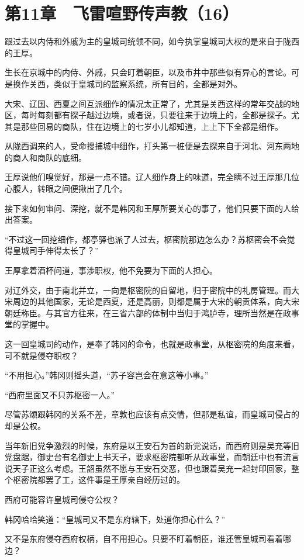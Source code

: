 \section{第11章　飞雷喧野传声教（16）}

跟过去以内侍和外戚为主的皇城司统领不同，如今执掌皇城司大权的是来自于陇西的王厚。

生长在京城中的内侍、外戚，只会盯着朝臣，以及市井中那些似有异心的言论。可是换作关西，类似于皇城司的监察系统，所有目的，全都是对外。

大宋、辽国、西夏之间互派细作的情况太正常了，尤其是关西这样的常年交战的地区，每时每刻都有探子越过边境，或者说，只要往来于边境上的，全都是探子。尤其是那些回易的商队，住在边境上的七岁小儿都知道，上上下下全都是细作。

从陇西调来的人，受命搜捕城中细作，打头第一桩便是去探来自于河北、河东两地的商人和商队的底细。

王厚说他们嗅觉好，那是一点不错。辽人细作身上的味道，完全瞒不过王厚那几位心腹人，转眼之间便揪出了几个。

接下来如何审问、深挖，就不是韩冈和王厚所要关心的事了，他们只要下面的人给出答案。

“不过这一回挖细作，都亭驿也派了人过去，枢密院那边怎么办？苏枢密会不会觉得皇城司手伸得太长了？”

王厚拿着酒杯问道，事涉职权，他不免要为下面的人担心。

对辽外交，由于南北并立，一向是枢密院的自留地，归于密院中的礼房管理。而大宋周边的其他国家，无论是西夏，还是高丽，则都是属于大宋的朝贡体系，向大宋朝廷称臣。与其官方往来，在三省六部的体制中当归于鸿胪寺，理所当然是在政事堂的掌握中。

这一回皇城司的动作，是奉了韩冈的命令，也就是政事堂，从枢密院的角度来看，可不就是侵夺职权？

“不用担心。”韩冈则摇头道，“苏子容岂会在意这等小事。”

“西府里面又不只苏枢密一人。”

尽管苏颂跟韩冈的关系不差，章敦也应该有点交情，但那是私谊，而皇城司侵占的却是公权。

当年新旧党争激烈的时候，东府是以王安石为首的新党说话，而西府则是吴充等旧党盘踞，御史台有名御史上书天子，要求枢密院都听从政事堂，而朝廷中也有流言说天子正这么考虑。王韶虽然不愿与王安石交恶，但也跟着吴充一起封印回家，整个枢密院都罢了工，这件事是王厚亲自经历过的。

西府可能容许皇城司侵夺公权？

韩冈哈哈笑道：“皇城司又不是东府辖下，处道你担心什么？”

又不是东府侵夺西府权柄，自不用担心。只要不盯着朝臣，谁还管皇城司看着哪边？

